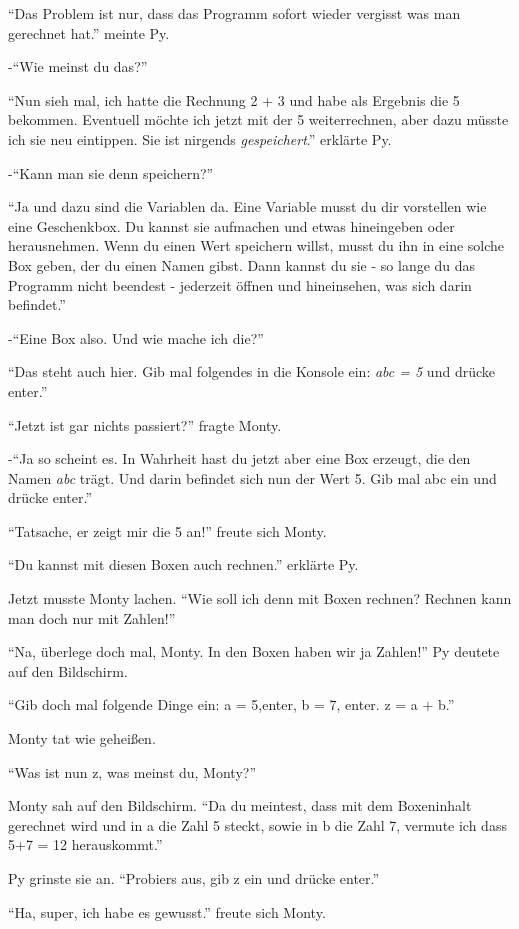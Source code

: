 \documentclass[a5paper,12pt,twoside,openright]{scrbook}
\begin{document}
"`Das Problem ist nur, dass das Programm sofort wieder vergisst was man gerechnet hat."'
meinte Py.

-"`Wie meinst du das?"'

"`Nun sieh mal, ich hatte die Rechnung 2 + 3 und habe als Ergebnis die 5 bekommen. Eventuell möchte ich jetzt mit der 5 weiterrechnen, 
aber dazu müsste ich sie neu eintippen. Sie ist nirgends \emph{gespeichert}."' erklärte Py.

-"`Kann man sie denn speichern?"'

"`Ja und dazu sind die Variablen da. Eine Variable musst du dir vorstellen wie eine Geschenkbox. 
Du kannst sie aufmachen und etwas hineingeben oder herausnehmen. Wenn du einen Wert speichern willst, musst du 
ihn in eine solche Box geben, der du einen Namen gibst. Dann kannst du sie - so lange du das Programm nicht beendest - 
jederzeit öffnen und hineinsehen, was sich darin befindet."'

-"`Eine Box also. Und wie mache ich die?"'

"`Das steht auch hier. Gib mal folgendes in die Konsole ein: \textit{abc = 5} und drücke enter."'

"`Jetzt ist gar nichts passiert?"' fragte Monty.

-"`Ja so scheint es. In Wahrheit hast du jetzt aber eine Box erzeugt, die den Namen \textit{abc} trägt. 
Und darin befindet sich nun der Wert 5. Gib mal abc ein und drücke enter."'

"`Tatsache, er zeigt mir die 5 an!"' freute sich Monty.

"`Du kannst mit diesen Boxen auch rechnen."' erklärte Py.

Jetzt musste Monty lachen.
"`Wie soll ich denn mit Boxen rechnen? Rechnen kann man doch nur mit Zahlen!"'

"`Na, überlege doch mal, Monty. In den Boxen haben wir ja Zahlen!"'
Py deutete auf den Bildschirm. 

"`Gib doch mal folgende Dinge ein: a = 5,enter, b = 7, enter.
z = a + b."'

Monty tat wie geheißen.

"`Was ist nun z, was meinst du, Monty?"'

Monty sah auf den Bildschirm.
"`Da du meintest, dass mit dem Boxeninhalt gerechnet wird und in a die Zahl 5 steckt, sowie in b die Zahl 7, vermute ich dass 5+7 = 12 herauskommt."'

Py grinste sie an.
"`Probiers aus, gib z ein und drücke enter."'

"`Ha, super, ich habe es gewusst."' freute sich Monty.
\end{document}
